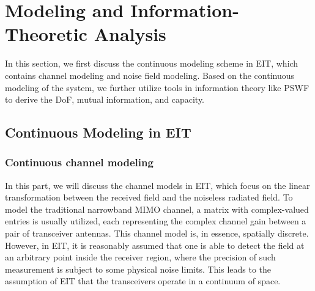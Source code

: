 \documentclass[journal,twocolumn]{IEEEtran}
\begin{document}
\section{Modeling and Information-Theoretic Analysis}
In this section, we first discuss the continuous modeling scheme in EIT, which contains channel modeling and noise field modeling. 
Based on the continuous modeling of the system, we further utilize tools in information theory like PSWF to derive the DoF, mutual information, and capacity.

\subsection{Continuous Modeling in EIT}
\subsubsection{Continuous channel modeling}
In this part, we will discuss the channel models in EIT, which focus on the linear transformation between the received field and the noiseless radiated field. 
To model the traditional narrowband MIMO channel, a matrix with complex-valued entries is usually utilized, each representing the complex channel gain between a pair of transceiver antennas. 
This channel model is, in essence, spatially discrete. 
However, in EIT, it is reasonably assumed that one is able to detect the field at an arbitrary point inside the receiver region, where the precision of such measurement is subject to some physical noise limits. This leads to the assumption of EIT that the transceivers operate in a continuum of space.  
\end{document}

